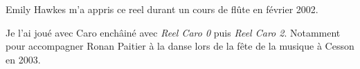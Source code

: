 
Emily Hawkes m'a appris ce reel durant un cours de flûte en février
2002. 

Je l'ai joué avec Caro enchâiné avec \emph{Reel Caro 0} puis \emph{Reel Caro
2}. Notamment pour accompagner Ronan Paitier à la danse lors de la fête de la
musique à Cesson en 2003.

\tune
